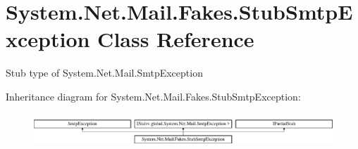 \hypertarget{class_system_1_1_net_1_1_mail_1_1_fakes_1_1_stub_smtp_exception}{\section{System.\-Net.\-Mail.\-Fakes.\-Stub\-Smtp\-Exception Class Reference}
\label{class_system_1_1_net_1_1_mail_1_1_fakes_1_1_stub_smtp_exception}
}


Stub type of System.\-Net.\-Mail.\-Smtp\-Exception 


Inheritance diagram for System.\-Net.\-Mail.\-Fakes.\-Stub\-Smtp\-Exception\-:\begin{figure}[H]
\begin{center}
\leavevmode
\includegraphics[height=1.300813cm]{class_system_1_1_net_1_1_mail_1_1_fakes_1_1_stub_smtp_exception}
\end{center}
\end{figure}
